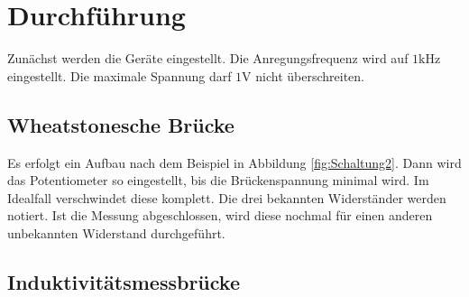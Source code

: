 \section{Durchführung}
\label{sec:Durchführung}

Zunächst werden die Geräte eingestellt.
Die Anregungsfrequenz wird auf $1 \si{\kilo\hertz}$ eingestellt.
Die maximale Spannung darf $1 \si{\volt}$ nicht überschreiten.

\subsection{Wheatstonesche Brücke} \label{sec:wheatdurchf}
Es erfolgt ein Aufbau nach dem Beispiel in Abbildung \ref{fig:Schaltung2}.
Dann wird das Potentiometer so eingestellt, bis die Brückenspannung minimal wird.
Im Idealfall verschwindet diese komplett.
Die drei bekannten Widerständer werden notiert.
Ist die Messung abgeschlossen, wird diese nochmal für einen anderen unbekannten Widerstand durchgeführt.

\subsection{Induktivitätsmessbrücke} \label{sec:induktdurchf}